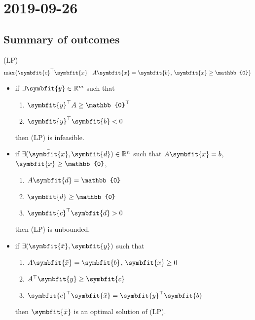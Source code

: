 \section{2019-09-26}
\subsection{Summary of outcomes}
(LP)
\[\max \{\symbfit{c}^\top \symbfit{x} \mid A\symbfit{x}=\symbfit{b}\text{, }
\symbfit{x}\ge\mathbb{0}\}\]
\begin{itemize}
    \item if $\exists \symbfit{y}\in\mathbb{R}^m$ such that
    \begin{enumerate}[(1)]
        \item $\symbfit{y}^\top A\ge\mathbb{0}^\top $
        \item $\symbfit{y}^\top \symbfit{b}<0$
    \end{enumerate}
    then (LP) is infeasible.
    \item if $\exists(\bar{\symbfit{x}}, \symbfit{d})\in\mathbb{R}^n$ such that $A\symbfit{x}=b$, $\symbfit{x}\ge \mathbb{0}$, 
    \begin{enumerate}[(1)]
        \item $A\symbfit{d}=\mathbb{0}$
        \item $\symbfit{d}\ge \mathbb{0}$
        \item $\symbfit{c}^\top \symbfit{d}>0$
    \end{enumerate}
    then (LP) is unbounded.
    \item if $\exists(\symbfit{\bar{x}},\symbfit{y})$ such that
    \begin{enumerate}[(1)]
        \item $A\symbfit{\bar{x}}=\symbfit{b}$, $\symbfit{x}\ge 0$
        \item $A^\top \symbfit{y}\ge\symbfit{c}$
        \item $\symbfit{c}^\top  \symbfit{\bar{x}}=\symbfit{y}^\top \symbfit{b}$
    \end{enumerate}
    then $\symbfit{\bar{x}}$ is an optimal solution of (LP).
\end{itemize}

